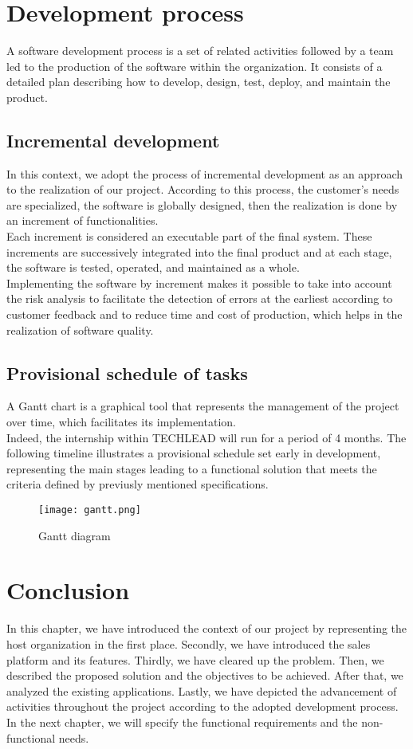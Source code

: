 \section{Development process}
A software development process is a set of related activities
followed by a team led to the production of the software within the organization. It consists of a detailed plan describing how to develop, design,
test, deploy, and maintain the product. \cite{4}
\subsection{Incremental development}
In this context, we adopt the process of incremental development as an approach to the realization of our project. According to this process, the customer's needs are specialized, the software is globally designed,
then the realization is done by an increment of functionalities.\cite{4} \\
Each increment
is considered an executable part of the final system. These increments
are successively integrated into the final product and at each stage, the software is
tested, operated, and maintained as a whole.\cite{4} \\
Implementing the software by
increment makes it possible to take into account the risk analysis to facilitate
the detection of errors at the earliest according to customer feedback and to reduce
time and cost of production, which helps in the realization of software
quality. \cite{4}
\subsection{Provisional schedule of tasks}
A Gantt chart is a graphical tool that represents the management
of the project over time, which facilitates its implementation.\\
Indeed, the internship within TECHLEAD will run for a period of 4 months. The following timeline illustrates a provisional schedule set early in development, representing the main stages leading to a functional solution that meets the criteria defined by previusly mentioned specifications.

\begin{figure}[H]%
    \center   
    \texttt{[image: gantt.png]}
    \caption{Gantt diagram}
\end{figure}
\section*{Conclusion}
In this chapter, we have introduced the context of our project by representing the host organization in the first place. Secondly, we have introduced the sales platform and its features. Thirdly, we have
cleared up the problem. Then, we described the proposed solution and
the objectives to be achieved. After that, we analyzed the existing applications. Lastly, we have depicted the advancement of
activities throughout the project according to the adopted development process.
In the next chapter, we will specify the functional requirements and the
non-functional needs.